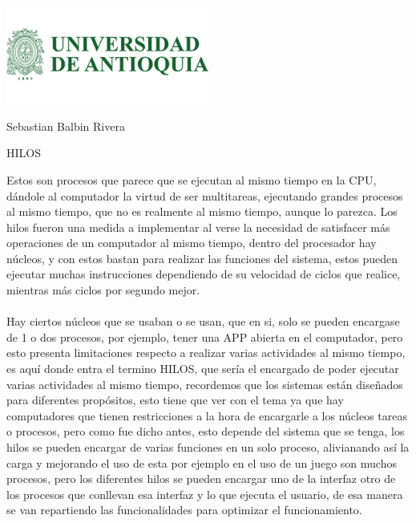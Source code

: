 \documentclass[11pt]{letter}
\begin{document}
\begin{center}
\includegraphics[width=0.5\textwidth]{logo-udea.png}\\
\end{center}

Sebastian Balbin Rivera\\
\begin{center}
HILOS
\end{center}
Estos son procesos que parece que se ejecutan al mismo tiempo en la CPU, dándole al computador la virtud de ser multitareas, ejecutando grandes procesos al mismo tiempo, que no es realmente al mismo tiempo, aunque lo parezca. Los hilos fueron una medida a implementar al verse la necesidad de satisfacer más operaciones de un computador al mismo tiempo, dentro del procesador hay núcleos, y con estos bastan para realizar las funciones del sistema, estos pueden ejecutar muchas instrucciones dependiendo de su velocidad de ciclos que realice, mientras más ciclos por segundo mejor. \\\\
Hay ciertos núcleos que se usaban o se usan, que en si, solo se pueden encargase de 1 o dos procesos, por ejemplo, tener una APP abierta en el computador, pero esto presenta limitaciones respecto a realizar varias actividades al mismo tiempo, es aquí donde entra el termino HILOS, que sería el encargado de poder ejecutar varias actividades al mismo tiempo, recordemos que los sistemas están diseñados para diferentes propósitos, esto tiene que ver con el tema ya que hay computadores que tienen restricciones a la hora de encargarle a los núcleos tareas o procesos, pero como fue dicho antes, esto depende del sistema que se tenga, los hilos se pueden encargar de varias funciones en un solo proceso, alivianando así la carga y mejorando el uso de esta por ejemplo en el uso de un juego son muchos procesos, pero los diferentes hilos se pueden encargar uno de la interfaz otro de los procesos que conllevan  esa interfaz y lo que ejecuta el usuario, de esa manera se van repartiendo las funcionalidades para optimizar el funcionamiento.\\\\
\end{document}
